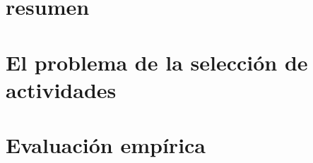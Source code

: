 \documentclass{./packages/informe}
\begin{document}
 



\section*{resumen}


\tableofcontents
\newpage

\section{El problema de la selección de actividades}


\vspace{2em}
\section{Evaluación empírica}

\newpage

% 

% 
% 
\end{document}
